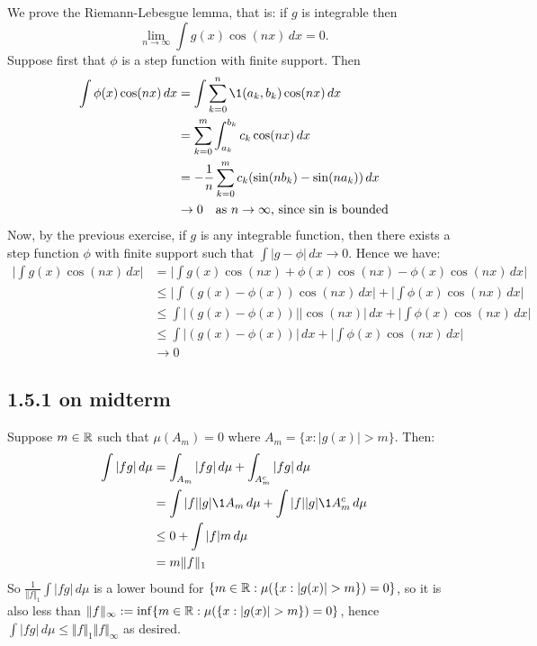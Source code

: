 \documentclass[11pt]{article}
\begin{document}
We prove the Riemann-Lebesgue lemma, that is: if $g$ is integrable then \[\lim_{n\to\infty} \int g(x) \cos(nx) \,dx = 0.\] Suppose first that $\phi$ is a step function with finite support. Then \begin{align*}
    \int \phi(x) \cos(nx) \,dx &  =\int \sum_{k=0}^{n} \1{(a_k,b_k)} \cos(nx)  \,dx\\
    &= \sum_{k=0}^{m} \int_{a_k}^{b_k} c_k\cos(nx) \,dx \\
    &= -\frac{1}{n}\sum_{k=0}^{m} c_k(\sin(nb_k)- \sin(na_k))\,dx \\
    &\to 0 \quad \text{as $n \to \infty$, since $\sin$ is bounded}
\end{align*} Now, by the previous exercise, if $g$ is any integrable function, then there exists a step function $\phi$ with finite support such that $\int |g - \phi| \,dx \to 0$. Hence we have: \begin{align*}
    \bigg|\int g(x) \cos(nx) \,dx \bigg| &=\bigg|\int g(x) \cos(nx)+ \phi(x)\cos(nx) - \phi(x)\cos(nx) \,dx \bigg| \\
    &\leq \bigg|\int (g(x) -\phi(x))\cos(nx) \,dx \bigg| + \bigg|\int \phi(x)\cos(nx) \,dx \bigg|\\
    &\leq \int \big|(g(x) -\phi(x))\big|\big|\cos(nx)\big| \,dx  + \bigg|\int \phi(x)\cos(nx) \,dx \bigg|\\
    &\leq  \int\big|(g(x) -\phi(x))\big| \,dx  + \bigg|\int \phi(x)\cos(nx) \,dx \bigg| \\
    &\to 0
\end{align*} 

\subsection*{1.5.1 on midterm}

Suppose $m \in {\mathbb R}$ such that $\mu(A_m)=0$ where $A_m = \{x : |g(x)| > m\}$. Then:
\begin{align*}
    \int |fg| \,d\mu  &=    \int_{A_m} |fg| \,d\mu +  \int_{A_m^c} |fg| \,d\mu\\
    &=\int |f||g| \1{A_m} \,d\mu + \int |f||g| \1{A_m^c} \,d\mu \\
    &\leq 0 + \int |f|m \,d\mu \\
    &= m \Vert f \Vert_1
\end{align*} So $\frac{1}{\Vert f \Vert_1}\int |fg| \,d\mu$ is a lower bound for $\{m \in {\mathbb R} : \mu(\{x : |g(x)| > m\}) = 0\}$, so it is also less than $\Vert f\Vert_{\infty} := \inf \{m \in {\mathbb R} : \mu(\{x : |g(x)| > m\}) = 0\}$, hence $\int |fg| \,d\mu \leq \Vert f \Vert_1\Vert f\Vert_{\infty}$ as desired.
\end{document}
